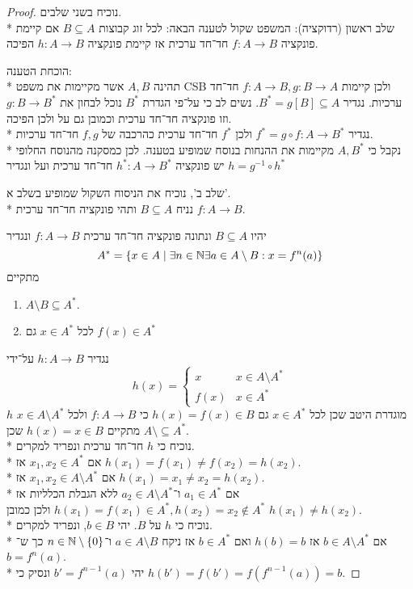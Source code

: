 \begin{proof}
	נוכיח בשני שלבים. \\*
	שלב ראשון (רדוקציה):
	המשפט שקול לטענה הבאה: לכל זוג קבוצות $B \subseteq A$ אם קיימת פונקציה $f : A \to B$ חד־חד ערכית אז קיימת פונקציה $h : A \to B$ הפיכה.

	הוכחת הטענה: \\*
	תהינה $A, B$ אשר מקיימות את משפט CSB ולכן קיימות $f : A \to B, g : B \to A$ חד־חד ערכיות.
	נגדיר $B^* = g[B] \subseteq A$. נשים לב כי על־פי הגדרת $B^*$ נוכל לבחון את $g : B \to B^*$ וזו פונקציה חד־חד ערכית וכמובן גם על ולכן הפיכה. \\*
	נגדיר $f^* = g \circ f : A \to B^*$ ולכן $f^*$ חד־חד ערכית כהרכבה של $f, g$ חד־חד ערכיות. \\*
	נקבל כי $A, B^*$ מקיימות את ההנחות בנוסח שמופיע בטענה.
	לכן כמסקנה מהנוסח החלופי יש פונקציה $h^* : A \to B^*$ חד־חד ערכית ועל ונגדיר $h = g^{-1} \circ h^*$

	שלב ב', נוכיח את הניסוח השקול שמופיע בשלב א'. \\*
	נניח $B \subseteq A$ ותהי פונקציה חד־חד ערכית $f : A \to B$.

	יהיו $B \subseteq A$ ונתונה פונקציה חד־חד ערכית $f : A \to B$ ונגדיר
	\[
		A^* = \{ x \in A \mid \exists n \in \mathbb{N} \exists a \in A \setminus B : x = f^n(a) \}
	\]
	מתקיים
	\begin{enumerate}
		\item $A \setminus B \subseteq A^*$.
		\item לכל $x \in A^*$ גם $f(x) \in A^*$
	\end{enumerate}
	נגדיר $h : A \to B$ על־ידי
	\[
		h(x) = \begin{cases}
			x & x \in A \setminus A^* \\
			f(x) & x \in A^*
		\end{cases}
	\]
	$h$ מוגדרת היטב שכן לכל $x \in A^*$ גם $h(x) = f(x) \in B$ כי $f : A \to B$ ולכל $x \in A \setminus A^*$ מתקיים $h(x) = x \in B$ שכן $A \setminus \subseteq A^*$. \\*
	נוכיח כי $h$ חד־חד ערכית ונפריד למקרים. \\*
	אם $x_1, x_2 \in A^*$ אז $h(x_1) = f(x_1) \ne f(x_2) = h(x_2)$. \\*
	אם $x_1, x_2 \in A \setminus A^*$ אז $h(x_1) = x_1 \ne x_2 = h(x_2)$. \\*
	אם $a_1 \in A^*$ ו־$a_2 \in A \setminus A^*$ ללא הגבלת הכלליות אז $h(x_1) = f(x_1) \in A^*, h(x_2) = x_2 \notin A^*$ ולכן כמובן $h(x_1) \ne h(x_2)$. \\*
	נוכיח כי $h$ על $B$.
	יהי $b \in B$, ונפריד למקרים. \\*
	אם $b \in A\setminus A^*$ אז $h(b) = b$ ואם $b \in A^*$ אז ניקח $a \in A \setminus B$ ו־$n \in \mathbb{N}\setminus\{0\}$ כך ש־$b = f^n(a)$. \\*
	יהי $b' = f^{n - 1}(a)$ ונסיק כי $h(b') = f(b') = f(f^{n - 1}(a)) = b$.
\end{proof}

